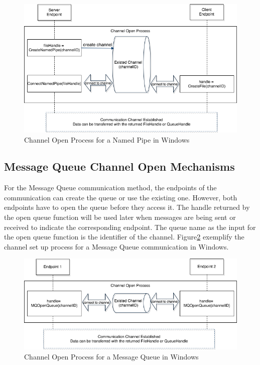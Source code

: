 \begin{figure}[H]
\centerline{\includegraphics[scale=0.5]{Figures/namepipechannelopen}}
 \caption{Channel Open Process for a Named Pipe in Windows}
\label{namedpipeopen}
\end{figure}
    
\subsection{Message Queue Channel Open Mechanisms} 
For the Message Queue communication method, the endpoints of the communication can create the queue or use the existing one. However, both endpoints have to open the queue before they access it. The handle returned by the open queue function will be used later when messages are being sent or received to indicate the corresponding endpoint. The queue name as the input for the open queue function is the identifier of the channel. Figure\ref{msmqopen} exemplify the channel set up process for a Message Queue communication in Windows.
\begin{figure}[H]
\centerline{\includegraphics[scale=0.5]{Figures/msmqchannelopen}}
 \caption{Channel Open Process for a Message Queue in Windows}
\label{msmqopen}
\end{figure}

